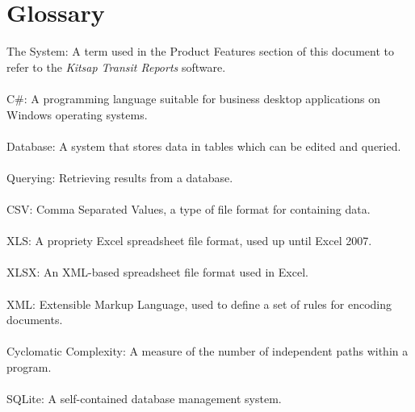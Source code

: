 \section{Glossary}
The System: A term used in the Product Features section of this document to refer to the \textit{Kitsap Transit Reports} software.\\\\
C\#: A programming language suitable for business desktop applications on Windows operating systems.\\\\
Database: A system that stores data in tables which can be edited and queried.\\\\
Querying: Retrieving results from a database.\\\\
CSV: Comma Separated Values, a type of file format for containing data.\\\\
XLS: A propriety Excel spreadsheet file format, used up until Excel 2007.\\\\
XLSX: An XML-based spreadsheet file format used in Excel.\\\\
XML: Extensible Markup Language, used to define a set of rules for encoding documents.\\\\
Cyclomatic Complexity: A measure of the number of independent paths within a program.\\\\
SQLite: A self-contained database management system.
